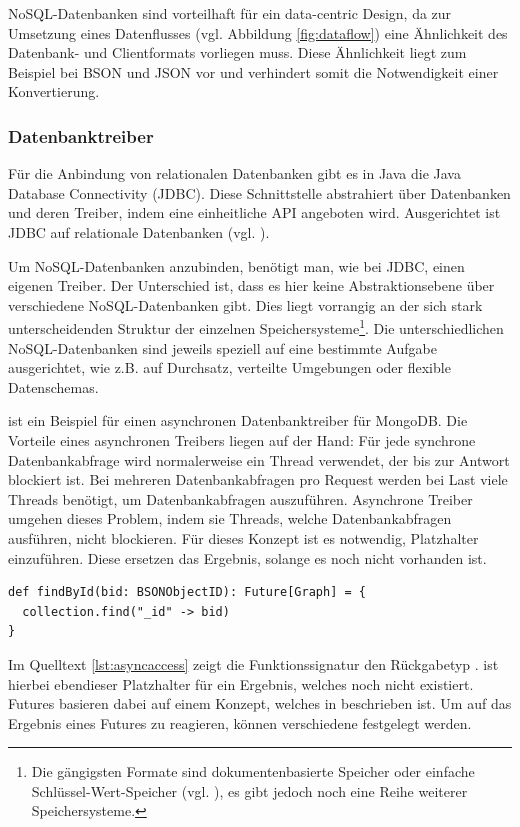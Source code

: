 NoSQL-Datenbanken sind vorteilhaft für ein data-centric Design, da zur Umsetzung eines Datenflusses (vgl. Abbildung \ref{fig:dataflow}) eine Ähnlichkeit des Datenbank- und Clientformats vorliegen muss. Diese Ähnlichkeit liegt zum Beispiel bei BSON und JSON vor und verhindert somit die Notwendigkeit einer Konvertierung.

\subsubsection{Datenbanktreiber}
\label{sec:reactive}
Für die Anbindung von relationalen Datenbanken gibt es in Java die Java Database Connectivity (JDBC). Diese Schnittstelle abstrahiert über Datenbanken und deren Treiber, indem eine einheitliche API angeboten wird. Ausgerichtet ist JDBC auf relationale Datenbanken (vgl. \cite{reese2000database}).

Um NoSQL-Datenbanken anzubinden, benötigt man, wie bei JDBC, einen eigenen Treiber. Der Unterschied ist, dass es hier keine Abstraktionsebene über verschiedene NoSQL-Datenbanken gibt. Dies liegt vorrangig an der sich stark unterscheidenden Struktur der einzelnen Speichersysteme\footnote{Die gängigsten Formate sind dokumentenbasierte Speicher oder einfache Schlüssel-Wert-Speicher (vgl. \cite{nosql-databases}), es gibt jedoch noch eine Reihe weiterer Speichersysteme.}. Die unterschiedlichen NoSQL-Datenbanken sind jeweils speziell auf eine bestimmte Aufgabe ausgerichtet, wie z.B. auf Durchsatz, verteilte Umgebungen oder flexible Datenschemas. 

 ist ein Beispiel für einen asynchronen Datenbanktreiber für MongoDB. Die Vorteile eines asynchronen Treibers liegen auf der Hand: Für jede synchrone Datenbankabfrage wird normalerweise ein Thread verwendet, der bis zur Antwort blockiert ist. Bei mehreren Datenbankabfragen pro Request werden bei Last viele Threads benötigt, um Datenbankabfragen auszuführen. Asynchrone Treiber umgehen dieses Problem, indem sie Threads, welche Datenbankabfragen ausführen, nicht blockieren. Für dieses Konzept ist es notwendig, Platzhalter einzuführen. Diese ersetzen das Ergebnis, solange es noch nicht vorhanden ist.

\begin{lstlisting}[label=lst:asyncaccess, caption=Funktionssignatur für asynchronen Datenbankzugriff]
def findById(bid: BSONObjectID): Future[Graph] = {
  collection.find("_id" -> bid)
}
\end{lstlisting}
 
Im Quelltext \ref{lst:asyncaccess} zeigt die Funktionssignatur den Rückgabetyp .  ist hierbei ebendieser Platzhalter für ein Ergebnis, welches noch nicht existiert. Futures basieren dabei auf einem Konzept, welches in \cite{future-concept} beschrieben ist. Um auf das Ergebnis eines Futures zu reagieren, können verschiedene  festgelegt werden.

